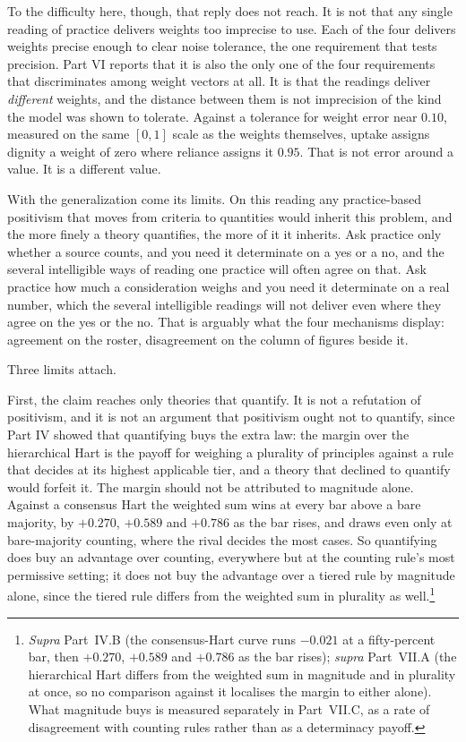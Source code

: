 To the difficulty here, though, that reply does not reach. It is not that any
single reading of practice delivers weights too imprecise to use. Each of the four delivers weights precise enough to clear noise tolerance, the
one requirement that tests precision. Part VI reports that it is also the only
one of the four requirements that discriminates among weight vectors at all. It is that
the readings deliver \textit{different} weights, and the distance between
them is not imprecision of the kind the model was shown to tolerate.
Against a tolerance for weight error near $0.10$, measured on the same
$[0,1]$ scale as the weights themselves, uptake assigns dignity a weight of
zero where reliance assigns it $0.95$. That is not error around a value.
It is a different value.

With the generalization come its limits. On this reading any
practice-based positivism that moves from criteria to quantities would
inherit this problem, and the more finely a theory quantifies, the more of
it it inherits. Ask practice only whether a source counts, and you need it determinate on a
yes or a no, and the several intelligible ways of reading one practice will
often agree on that. Ask practice how much a
consideration weighs and you need it determinate on a real number, which
the several intelligible readings will not deliver even where they agree
on the yes or the no. That is arguably what the four mechanisms display: agreement on the roster,
disagreement on the column of figures beside it.

Three limits attach.

First, the claim reaches only theories that quantify. It is not a refutation
of positivism, and it is not an argument that positivism ought not to
quantify, since Part IV showed that quantifying buys the extra law: the margin over the hierarchical Hart is the
payoff for weighing a plurality of principles against a rule that decides
at its highest applicable tier, and a theory that declined to quantify
would forfeit it. The margin should not be attributed to magnitude alone. Against a consensus
Hart the weighted sum wins at every bar above a bare majority, by $+0.270$,
$+0.589$ and $+0.786$ as the bar rises, and draws even only at bare-majority
counting, where the rival decides the most cases. So quantifying does buy an
advantage over counting, everywhere but at the counting rule's most permissive
setting; it does not buy the advantage over a tiered rule by
magnitude alone, since the tiered rule differs from the weighted sum in
plurality as well.\footnote{\textit{Supra} Part~IV.B (the
consensus-Hart curve runs $-0.021$ at a fifty-percent bar, then $+0.270$,
$+0.589$ and $+0.786$ as the bar rises); \textit{supra} Part~VII.A (the
hierarchical Hart differs from the weighted sum in magnitude and in
plurality at once, so no comparison against it localises the margin to
either alone). What magnitude buys is measured separately in Part~VII.C,
as a rate of disagreement with counting rules rather than as a
determinacy payoff.}


